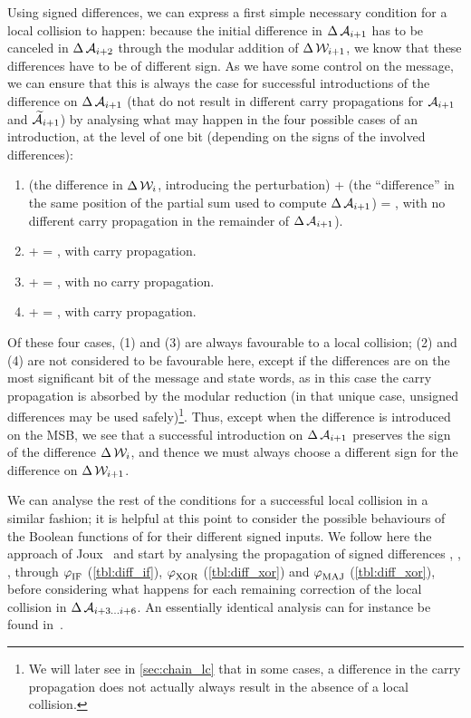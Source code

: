 Using signed differences, we can express a first simple necessary condition for a local collision to happen: because the initial difference in $\operatorname{\Delta}\mathcal{A}_{i+1}$ has to be
canceled in $\operatorname{\Delta}\mathcal{A}_{i+2}$ through the modular addition of $\operatorname{\Delta}\mathcal{W}_{i+1}$, we know that these differences have to be of different sign. As we have some control on the
message, we can ensure that this is always the case for successful introductions of the difference on $\operatorname{\Delta}\mathcal{A}_{i+1}$ (that do not result in different carry propagations for
$\mathcal{A}_{i+1}$ and $\mathcal{\widetilde A}_{i+1}$) by analysing what may happen in the four possible cases  of an introduction, at the level of one bit (depending on the signs of the involved differences):
\begin{enumerate}
\item \onediffu (the difference in $\operatorname{\Delta}\mathcal{W}_i$, introducing the perturbation) + \nodiffz (the ``difference'' in the same position of the partial sum used to compute $\operatorname{\Delta}\mathcal{A}_{i+1}$) = \onediffu,
with no different carry propagation in the remainder of $\operatorname{\Delta}\mathcal{A}_{i+1}$). 
\item \onediffu  + \nodiffo = \onediffd, with carry propagation.
\item \onediffd  + \nodiffz = \onediffd, with no carry propagation.
\item \onediffd  + \nodiffo = \onediffu, with carry propagation.
\end{enumerate}
Of these four cases, (1) and (3) are always favourable to a local collision; (2) and (4) are not considered to be favourable here, except if the differences are on the most significant bit
of the message and state words, as in this case the carry propagation is absorbed by the modular reduction (in that unique case, unsigned differences may be used safely)\footnote{We will
later see in \autoref{sec:chain_lc} that in some cases, a difference in the carry propagation does not actually always result in the absence of a local collision.}.
Thus, except when the difference is introduced on the MSB, we see that
a successful introduction on $\operatorname{\Delta}\mathcal{A}_{i+1}$ preserves the sign of the difference $\operatorname{\Delta}\mathcal{W}_i$, and thence we must always
choose a different sign for the difference on $\operatorname{\Delta}\mathcal{W}_{i+1}$.

We can analyse the rest of the conditions for a successful local collision in a similar fashion; it is helpful at this point to consider the possible behaviours of the Boolean functions of \sha
for their different signed inputs. We follow here the approach of Joux~\cite[Chapter 5]{algocrypt} and start by analysing the propagation of signed differences \nodiffz, \nodiffo,
\onediffd, \onediffu through $\operatorname{\varphi}_\text{IF}$ (\autoref{tbl:diff_if}), $\operatorname{\varphi}_\text{XOR}$ (\autoref{tbl:diff_xor}) and $\operatorname{\varphi}_\text{MAJ}$ (\autoref{tbl:diff_xor}), before
considering what happens for each remaining correction of the local collision in $\operatorname{\Delta}\mathcal{A}_{i+3\ldots i+6}$.
An essentially identical analysis can for instance be found in~\cite{phdpeyrin,DBLP:journals/joc/BihamCJ15}.

